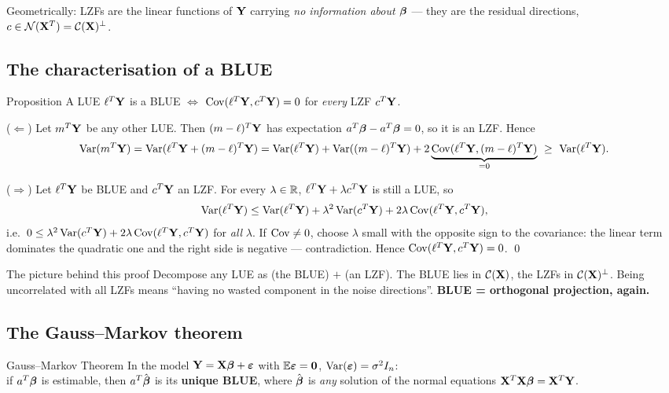 \documentclass[11pt]{article}
\begin{document}
Geometrically: LZFs are the linear functions of $\mathbf{Y}$ carrying \emph{no information about
$\boldsymbol{\beta}$} --- they are the residual directions, $c\in\mathcal{N}(\mathbf{X}^T)=\mathcal{C}(\mathbf{X})^\perp$.

\subsection{The characterisation of a BLUE}

\begin{idea}{Proposition}
A LUE $\ell^T\mathbf{Y}$ is a BLUE $\iff$ $\operatorname{Cov}(\ell^T\mathbf{Y},c^T\mathbf{Y})=0$ for \emph{every} LZF $c^T\mathbf{Y}$.
\end{idea}

\prf ($\Leftarrow$) Let $m^T\mathbf{Y}$ be any other LUE. Then $(m-\ell)^T\mathbf{Y}$ has expectation
$a^T\boldsymbol{\beta}-a^T\boldsymbol{\beta}=0$, so it is an LZF. Hence
\[
  \operatorname{Var}(m^T\mathbf{Y})=\operatorname{Var}(\ell^T\mathbf{Y}+(m-\ell)^T\mathbf{Y})
  =\operatorname{Var}(\ell^T\mathbf{Y})+\operatorname{Var}((m-\ell)^T\mathbf{Y})+2\underbrace{\operatorname{Cov}(\ell^T\mathbf{Y},(m-\ell)^T\mathbf{Y})}_{=0}
  \ \ge\ \operatorname{Var}(\ell^T\mathbf{Y}).
\]

($\Rightarrow$) Let $\ell^T\mathbf{Y}$ be BLUE and $c^T\mathbf{Y}$ an LZF. For every $\lambda\in\mathbb{R}$,
$\ell^T\mathbf{Y}+\lambda c^T\mathbf{Y}$ is still a LUE, so
\[
  \operatorname{Var}(\ell^T\mathbf{Y})\le \operatorname{Var}(\ell^T\mathbf{Y})+\lambda^2\operatorname{Var}(c^T\mathbf{Y})+2\lambda\operatorname{Cov}(\ell^T\mathbf{Y},c^T\mathbf{Y}),
\]
i.e.\ $0\le \lambda^2\operatorname{Var}(c^T\mathbf{Y})+2\lambda\operatorname{Cov}(\ell^T\mathbf{Y},c^T\mathbf{Y})$ for \emph{all} $\lambda$.
If $\operatorname{Cov}\neq0$, choose $\lambda$ small with the opposite sign to the covariance: the linear
term dominates the quadratic one and the right side is negative --- contradiction. Hence
$\operatorname{Cov}(\ell^T\mathbf{Y},c^T\mathbf{Y})=0$. \qed

\begin{idea}{The picture behind this proof}
Decompose any LUE as (the BLUE) $+$ (an LZF). The BLUE lies in $\mathcal{C}(\mathbf{X})$, the LZFs in
$\mathcal{C}(\mathbf{X})^\perp$. Being uncorrelated with all LZFs means ``having no wasted component in the
noise directions''. \textbf{BLUE = orthogonal projection, again.}
\end{idea}

\subsection{The Gauss--Markov theorem}

\begin{idea}{Gauss--Markov Theorem}
In the model $\mathbf{Y}=\mathbf{X}\boldsymbol{\beta}+\boldsymbol{\varepsilon}$ with $\mathbb{E}\boldsymbol{\varepsilon}=\mathbf{0}$, $\operatorname{Var}(\boldsymbol{\varepsilon})=\sigma^2I_n$: \\
if $a^T\boldsymbol{\beta}$ is estimable, then $a^T\hat{\boldsymbol{\beta}}$ is its \textbf{unique BLUE}, where $\hat{\boldsymbol{\beta}}$ is
\emph{any} solution of the normal equations $\mathbf{X}^T\mathbf{X}\boldsymbol{\beta}=\mathbf{X}^T\mathbf{Y}$.
\end{idea}
\end{document}
